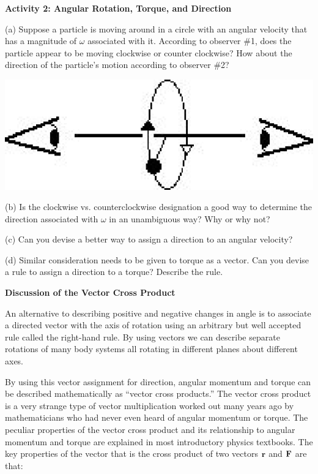 \textbf{Activity 2: Angular Rotation, Torque, and Direction }

(a) Suppose a particle is moving around in a circle with an angular velocity
that has a magnitude of \( \omega  \) associated with it. According to observer
\#1, does the particle appear to be moving clockwise or counter clockwise? How
about the direction of the particle's motion according to observer \#2?

\vspace{0.3cm}
{\par\raggedright \includegraphics{ang_mom_fig2.eps} \par}
\vspace{0.3cm}

(b) Is the clockwise vs. counterclockwise designation a good way to determine
the direction associated with $\omega$ in an unambiguous way? Why or why not? 
\vspace{20mm}

(c) Can you devise a better way to assign a direction to an angular
velocity?
\vspace{20mm}

(d) Similar consideration needs to be given to torque as a vector. Can you devise
a rule to assign a direction to a torque? Describe the rule.
\vspace{20mm}

\textbf{Discussion of the Vector Cross Product }

An alternative to describing positive and negative changes in angle is to associate
a directed vector with the axis of rotation using an arbitrary but
well accepted rule called the right-hand rule. By using vectors we can describe
separate rotations of many body systems all rotating in different planes about
different axes. 

By using this vector assignment for direction, angular momentum and torque can
be described mathematically as ``vector cross products.'' The
vector cross product is a very strange type of vector multiplication worked
out many years ago by mathematicians who had never even heard of angular momentum or torque. The peculiar properties of the vector cross product and its relationship to angular momentum and torque are explained in most introductory physics textbooks.
The key properties of the vector that is the cross product of two vectors \( 
{\bf r} \)
and \( {\bf F} \) are that:

